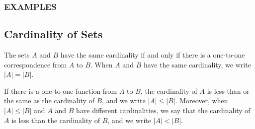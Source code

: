 \subsubsection{EXAMPLES}
\newpage
\subsection{Cardinality of Sets}
\begin{defn}[Cardinality]
The sets $A$ and $B$ have the same cardinality if and only if there is a one-to-one correspondence from $A$ to $B$. When $A$ and $B$ have the same cardinality, we write $|A| = |B|$.

\end{defn}
\begin{defn}[$|A| \leq |B|$]
If there is a one-to-one function from $A$ to $B$, the cardinality of $A$ is less than or the same as the cardinality of $B$, and we write $|A| \leq |B|$. Moreover, when $|A| \leq |B|$ and $A$ and $B$ have different cardinalities, we say that the cardinality of $A$ is less than the cardinality of $B$, and we write $|A| < |B|$.
\end{defn}

